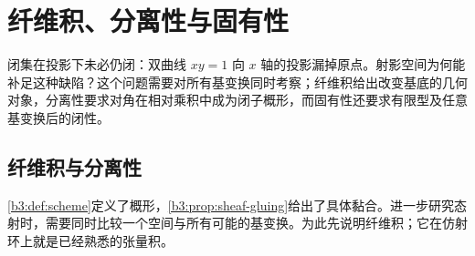 
\section{纤维积、分离性与固有性}
\label{b3:sec:2404}

闭集在投影下未必仍闭：双曲线 \(xy=1\) 向 \(x\) 轴的投影漏掉原点。射影空间为何能补足这种缺陷？这个问题需要对所有基变换同时考察；纤维积给出改变基底的几何对象，分离性要求对角在相对乘积中成为闭子概形，而固有性还要求有限型及任意基变换后的闭性。


%
%
%

\subsection{纤维积与分离性}
\label{b3:subsec:2404:01}

\cref{b3:def:scheme}定义了概形，\cref{b3:prop:sheaf-gluing}给出了具体黏合。进一步研究态射时，需要同时比较一个空间与所有可能的基变换。为此先说明纤维积；它在仿射环上就是已经熟悉的张量积。

